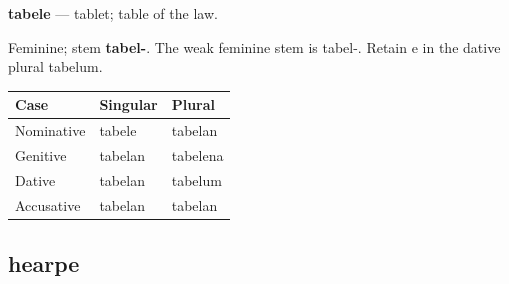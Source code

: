 \par\begin{minipage}{\linewidth}\raggedright
\textbf{tabele} — tablet; table of the law.

Feminine; stem \textbf{tabel-}. The weak feminine stem is tabel-. Retain e in the dative plural tabelum.

\par\begingroup
\fontsize{10.5}{13.2}\selectfont
\setlength{\LTleft}{0pt}\setlength{\LTright}{\fill}
\noindent
\begin{tabular}{@{}>{\raggedright\arraybackslash}p{39.46mm}>{\raggedright\arraybackslash}p{39.46mm}>{\raggedright\arraybackslash}p{39.46mm}@{}}
\toprule
\textbf{Case} & \textbf{Singular} & \textbf{Plural} \\
\midrule
Nominative & tabele & tabelan \\
Genitive & tabelan & tabelena \\
Dative & tabelan & tabelum \\
Accusative & tabelan & tabelan \\
\bottomrule
\end{tabular}
\par\endgroup

\end{minipage}\par
{}
\subsection*{hearpe}

